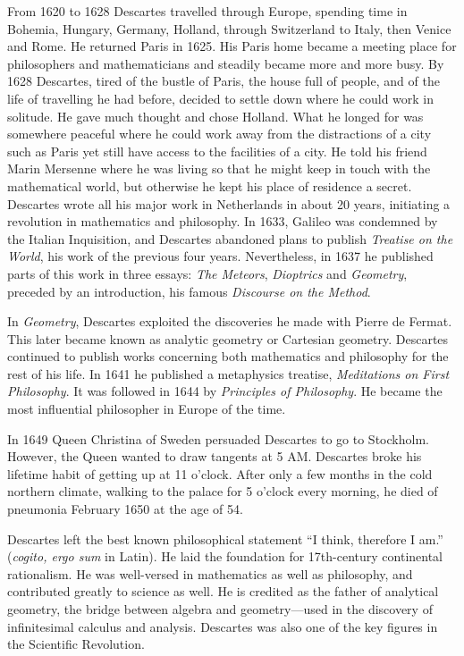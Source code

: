 \documentclass[b5paper]{article}
\begin{document}
\begin{mdframed}
From 1620 to 1628 Descartes travelled through Europe, spending time in Bohemia, Hungary, Germany, Holland, through Switzerland to Italy, then Venice and Rome. He returned Paris in 1625. His Paris home became a meeting place for philosophers and mathematicians and steadily became more and more busy. By 1628 Descartes, tired of the bustle of Paris, the house full of people, and of the life of travelling he had before, decided to settle down where he could work in solitude. He gave much thought and chose Holland. What he longed for was somewhere peaceful where he could work away from the distractions of a city such as Paris yet still have access to the facilities of a city. He told his friend Marin Mersenne where he was living so that he might keep in touch with the mathematical world, but otherwise he kept his place of residence a secret. Descartes wrote all his major work in Netherlands in about 20 years, initiating a revolution in mathematics and philosophy. In 1633, Galileo was condemned by the Italian Inquisition, and Descartes abandoned plans to publish {\em Treatise on the World}, his work of the previous four years. Nevertheless, in 1637 he published parts of this work in three essays: {\em The Meteors}, {\em Dioptrics} and {\em Geometry}, preceded by an introduction, his famous {\em Discourse on the Method}.

In {\em Geometry}, Descartes exploited the discoveries he made with Pierre de Fermat. This later became known as analytic geometry or Cartesian geometry. Descartes continued to publish works concerning both mathematics and philosophy for the rest of his life. In 1641 he published a metaphysics treatise, {\em Meditations on First Philosophy}. It was followed in 1644 by {\em Principles of Philosophy}. He became the most influential philosopher in Europe of the time.

In 1649 Queen Christina of Sweden persuaded Descartes to go to Stockholm. However, the Queen wanted to draw tangents at 5 AM. Descartes broke his lifetime habit of getting up at 11 o'clock. After only a few months in the cold northern climate, walking to the palace for 5 o'clock every morning, he died of pneumonia February 1650 at the age of 54.

Descartes left the best known philosophical statement \enquote{I think, therefore I am.} (\emph{cogito, ergo sum} in Latin). He laid the foundation for 17th-century continental rationalism. He was well-versed in mathematics as well as philosophy, and contributed greatly to science as well. He is credited as the father of analytical geometry, the bridge between algebra and geometry—used in the discovery of infinitesimal calculus and analysis. Descartes was also one of the key figures in the Scientific Revolution.
\end{mdframed}
\end{document}
